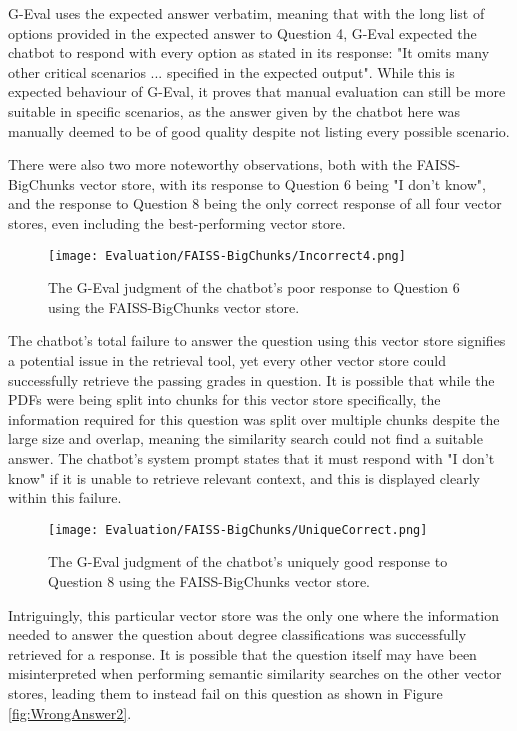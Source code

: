 \noindent G-Eval uses the expected answer verbatim, meaning that with the long list of options provided in the expected answer to Question 4, 
G-Eval expected the chatbot to respond with every option as stated in its response: "It omits many other critical scenarios ... specified in the expected output". While this is expected behaviour of G-Eval, it proves that manual evaluation can still 
be more suitable in specific scenarios, as the answer given by the chatbot here was manually deemed to be of good quality despite not listing 
every possible scenario.

\para There were also two more noteworthy observations, both with the FAISS-BigChunks vector store, with its response to Question 6 being 
"I don't know", and the response to Question 8 being the only correct response of all four vector stores, even including the best-performing
vector store.

\begin{figure}[H]
    \centering
    \texttt{[image: Evaluation/FAISS-BigChunks/Incorrect4.png]}
    \caption{The G-Eval judgment of the chatbot's poor response to Question 6 using the FAISS-BigChunks vector store. \label{fig:ChatbotIDK}}
\end{figure}

\noindent The chatbot's total failure to answer the question using this vector store signifies a potential issue in the retrieval tool, yet every 
other vector store could successfully retrieve the passing grades in question. It is possible that while the PDFs were being split into chunks 
for this vector store specifically, the information required for this question was split over multiple chunks despite the large size and overlap,
meaning the similarity search could not find a suitable answer. The chatbot's system prompt states that it must respond with "I don't know" if it 
is unable to retrieve relevant context, and this is displayed clearly within this failure.

\begin{figure}[H]
    \centering
    \texttt{[image: Evaluation/FAISS-BigChunks/UniqueCorrect.png]}
    \caption{The G-Eval judgment of the chatbot's uniquely good response to Question 8 using the FAISS-BigChunks vector store. \label{fig:UniqueCorrect}}
\end{figure}

\noindent Intriguingly, this particular vector store was the only one where the information needed to answer the question about degree classifications 
was successfully retrieved for a response. It is possible that the question itself may have been misinterpreted when performing semantic similarity searches on the other vector stores, leading them to instead fail on this question as shown in Figure \ref{fig:WrongAnswer2}.

